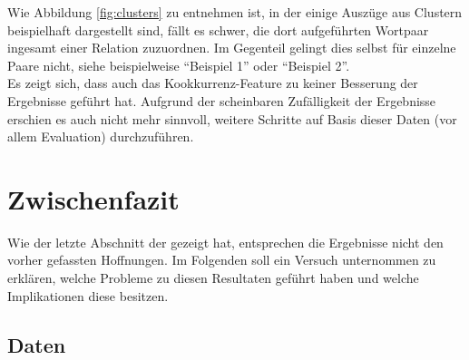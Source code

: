 Wie Abbildung \ref{fig:clusters} zu entnehmen ist, in der einige Auszüge aus Clustern beispielhaft dargestellt sind,
fällt es schwer, die dort aufgeführten Wortpaar ingesamt einer Relation zuzuordnen. Im Gegenteil gelingt dies selbst für
einzelne Paare nicht, siehe beispielweise ``Beispiel 1'' oder ``Beispiel 2''.\\
Es zeigt sich, dass auch das Kookkurrenz-Feature zu keiner Besserung der Ergebnisse geführt hat. Aufgrund der scheinbaren
Zufälligkeit der Ergebnisse erschien es auch nicht mehr sinnvoll, weitere Schritte auf Basis dieser Daten (vor allem Evaluation)
durchzuführen.\\

\section{Zwischenfazit}\label{sec:zwi-dis}

Wie der letzte Abschnitt der gezeigt hat, entsprechen die Ergebnisse nicht den vorher gefassten Hoffnungen.
Im Folgenden soll ein Versuch unternommen zu erklären, welche Probleme zu diesen Resultaten geführt haben und welche
Implikationen diese besitzen.

\subsection{Daten}\label{sec:zwi-dis-data}

